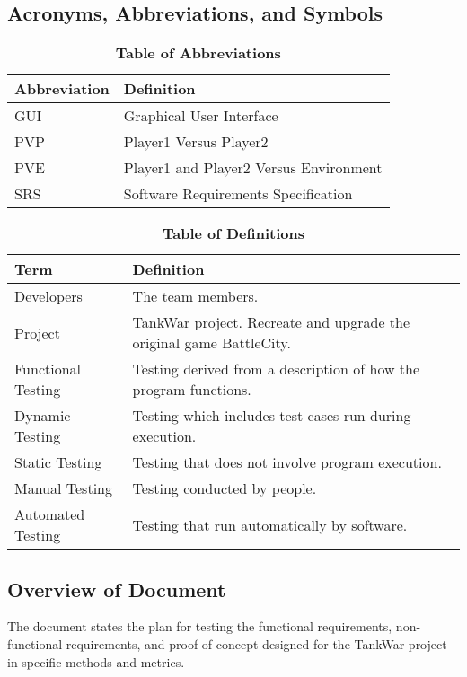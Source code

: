 \documentclass[12pt, titlepage]{article}
\begin{document}
\subsection{Acronyms, Abbreviations, and Symbols}
	
\begin{table}[h]
\caption{\textbf{Table of Abbreviations}} \label{Table}

\begin{tabularx}{\textwidth}{p{3cm}X}
\toprule
\textbf{Abbreviation} & \textbf{Definition} \\
\midrule
GUI & Graphical User Interface\\ \hline
PVP & Player1 Versus Player2\\ \hline
PVE & Player1 and Player2 Versus Environment\\ \hline
SRS & Software Requirements Specification\\
\bottomrule
\end{tabularx}

\end{table}

\begin{table}[h]
\caption{\textbf{Table of Definitions}} \label{Table}

\begin{tabularx}{\textwidth}{p{3cm}X}
\toprule
\textbf{Term} & \textbf{Definition}\\
\midrule
Developers & The team members.\\ \hline
Project & TankWar project. Recreate and upgrade the original game BattleCity.\\ \hline
Functional Testing & Testing derived from a description of how the program functions.\\ \hline
Dynamic Testing & Testing which includes test cases run during execution.\\ \hline
Static Testing & Testing that does not involve program execution.\\ \hline
Manual Testing & Testing conducted by people.\\ \hline
Automated Testing & Testing that run automatically by software.\\

\bottomrule
\end{tabularx}

\end{table}	
\newpage
\subsection{Overview of Document}
The document states the plan for testing the functional requirements, non-functional requirements, and proof of concept designed for the TankWar project in specific methods and metrics. 
\end{document}
